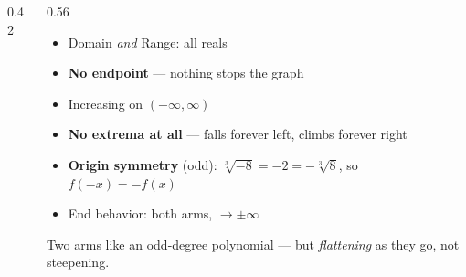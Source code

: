 \documentclass[aspectratio=169, 11pt]{beamer}
\newcommand{\lgrid}[4]{%
  \draw[step=1, linegray!45, thin] (#1,#3) grid (#2,#4);
  \draw[->, thick, charcoal] (#1,0)--(#2,0) node[below right, font=\tiny]{$x$};
  \draw[->, thick, charcoal] (0,#3)--(0,#4) node[left, font=\tiny]{$y$};}
\newcommand{\cbrtpos}[2]{\draw[very thick, forest, domain=#1:#2, samples=70, smooth]
  plot (\x,{pow(\x,1/3)});}
\newcommand{\cbrtneg}[2]{\draw[very thick, forest, domain=#1:#2, samples=70, smooth]
  plot (\x,{-pow(-1*(\x),1/3)});}
\begin{document}
\begin{frame}[t, plain]
  \begin{columns}[T]
    \begin{column}{0.42\textwidth}
      \centering
    \end{column}
    \begin{column}{0.56\textwidth}
      \footnotesize
      \begin{itemize}\setlength{\itemsep}{3pt}
        \item Domain \emph{and} Range: all reals
        \item \textbf{No endpoint} --- nothing stops the graph
        \item Increasing on $(-\infty,\infty)$
        \item \textbf{No extrema at all} --- falls forever left, climbs forever right
        \item \textbf{Origin symmetry} (odd): $\sqrt[3]{-8}=-2=-\sqrt[3]{8}$, so $f(-x)=-f(x)$
        \item End behavior: both arms, $\to\pm\infty$
      \end{itemize}
      \vspace{2pt}
      {\footnotesize Two arms like an odd-degree polynomial --- but \emph{flattening} as they go,
      not steepening.}
    \end{column}
  \end{columns}
\end{frame}
\end{document}
